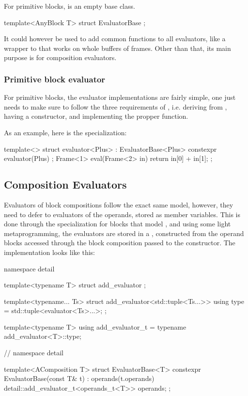 For primitive blocks,  is an empty base class.

\begin{cppcodenl}
  template<AnyBlock T>
  struct EvaluatorBase {};
\end{cppcodenl}

It could however be used to add common functions to all evaluators, like a wrapper to 
that works on whole buffers of frames. Other than that, its main purpose is for composition evaluators.

\subsubsection{Primitive block evaluator}
For primitive blocks, the evaluator implementations are fairly simple, one just needs to make sure to follow
the three requirements of , i.e. deriving from
, having a  constructor, and implementing the propper 
function.

As an example, here is the  specialization:

\begin{cppcodenl}
  template<>
  struct evaluator<Plus> : EvaluatorBase<Plus> {
    constexpr evaluator(Plus) {};
    Frame<1> eval(Frame<2> in)
    {
      return {in[0] + in[1]};
    }
  };
\end{cppcodenl}

\subsection{Composition Evaluators}

Evaluators of block compositions follow the exact same model, however, they need to defer to evaluators of
the operands, stored as member variables. This is done through the  specialization for
blocks that model , and using some light metaprogramming, the evaluators are stored in
a , constructed from the operand blocks accessed through the block composition passed
to the constructor. The implementation looks like this:

\begin{cppcodenl}
  namespace detail {
    template<typename T>
    struct add_evaluator {};

    template<typename... Ts>
    struct add_evaluator<std::tuple<Ts...>> {
      using type = std::tuple<evaluator<Ts>...>;
    };

    template<typename T>
    using add_evaluator_t = typename add_evaluator<T>::type;
  } // namespace detail

  template<AComposition T>
  struct EvaluatorBase<T> {
    constexpr EvaluatorBase(const T& t) : operands(t.operands) {}
    detail::add_evaluator_t<operands_t<T>> operands;
  };
\end{cppcodenl}

